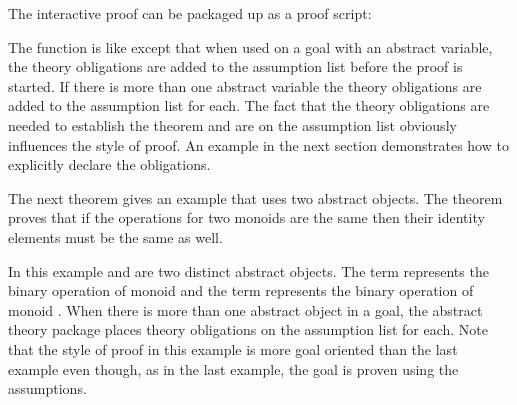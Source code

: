 The interactive proof can be packaged up as a proof script:
\begin{boxed}\begin{hol}\begin{alltt}

\end{alltt}\end{hol}\end{boxed}
The function  is like  except that when
used on a goal with an abstract variable, the theory obligations are added
to the assumption list before the proof is started.  If there is more than
one abstract variable the theory obligations are added to the assumption
list for each.  The fact that the theory obligations are needed to
establish the theorem and are on the assumption list obviously influences
the style of proof.  An example in the next section demonstrates how to
explicitly declare the obligations.

The next theorem gives an example that uses two abstract objects.  The
theorem proves that if the operations for two monoids are the same then
their identity elements must be the same as well.
\begin{boxed}\begin{hol}\begin{alltt}

\end{alltt}\end{hol}\end{boxed}
In this example  and  are two distinct abstract objects.  The
term  represents the binary operation of monoid  and the
term  represents the binary operation of monoid .  When
there is more than one abstract object in a goal, the abstract theory
package places theory obligations on the assumption list for each. Note
that the style of proof in this example is more goal oriented than the last
example even though, as in the last example, the goal is proven using the
assumptions.


